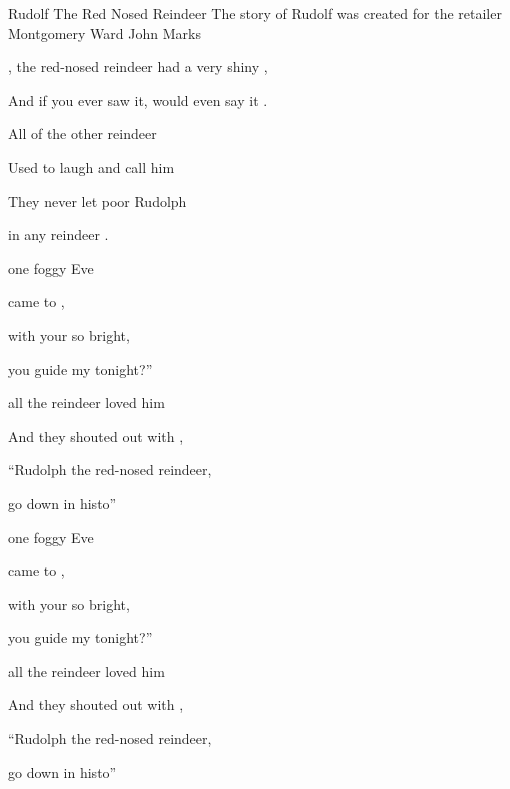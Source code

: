 \begin{SBSong}{Rudolf The Red Nosed Reindeer}
    {The story of Rudolf was created for the retailer Montgomery Ward}
    {John Marks}
  \begin{SBVerse}
	, the red-nosed reindeer had a very shiny , 

    And if you ever saw it,  would even say it .
	
	All of the other reindeer
	
	Used to laugh and call him 
	
	They never let poor Rudolph
	
	 in any reindeer . 
  \end{SBVerse}
  \begin{SBVerse}
	 one foggy  Eve
	
	 came to , 

     with your  so bright,
	
	 you guide my  tonight?''
	
	 all the reindeer loved him
	
	And they shouted out with ,
	
	``Rudolph the red-nosed reindeer,
	
	 go down in histo'' 
  \end{SBVerse}
  \ifChordBk
    \begin{SBVerse}
       one foggy  Eve
	
	   came to , 

       with your  so bright,
	
	   you guide my  tonight?''
	
	   all the reindeer loved him
	
	  And they shouted out with ,
	
	  ``Rudolph the red-nosed reindeer,
	
	   go down in histo''
    \end{SBVerse}
  \fi
\end{SBSong}

